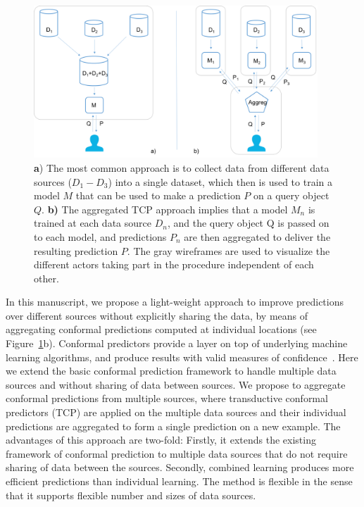 \documentclass[preprint,12pt,authoryear]{elsarticle}
\begin{document}
 \begin{figure}[b!]
    \includegraphics[width=0.95\textwidth]{fig-overview.png}
    \caption{\textbf{a}) The most common approach is to collect data from different data sources ($D_1-D_3$) into a single dataset, which then is used to train a model $M$ that can be used to make a prediction $P$ on a query object $Q$. \textbf{b)} The aggregated TCP approach implies that a model $M_n$ is trained at each data source $D_n$, and the query object Q is passed on to each model, and predictions $P_n$ are then aggregated to deliver the resulting prediction $P$. The gray wireframes are used to visualize the different actors taking part in the procedure independent of each other.}
  \label{fig:overview}
\end{figure}

In this manuscript, we propose a light-weight approach to improve predictions over different sources without explicitly sharing the data, by means of aggregating conformal predictions computed at individual locations (see Figure~\ref{fig:overview}b). 
Conformal predictors provide a layer on top of underlying machine learning algorithms, and produce results with valid measures of confidence~\cite{vovk2005algorithmic}.
Here we extend the basic conformal prediction framework to handle multiple data sources and without sharing of data between sources. We propose to aggregate conformal predictions from multiple sources, where transductive conformal predictors (TCP) are applied on the multiple data sources and their individual predictions are aggregated to form a single prediction on a new example.
The advantages of this approach are two-fold: 
Firstly, it extends the existing framework of conformal prediction to multiple data sources that do not require sharing of data between the sources. Secondly, combined learning produces more efficient predictions than individual learning. The method is flexible in the sense that it supports flexible number and sizes of data sources.
\end{document}
